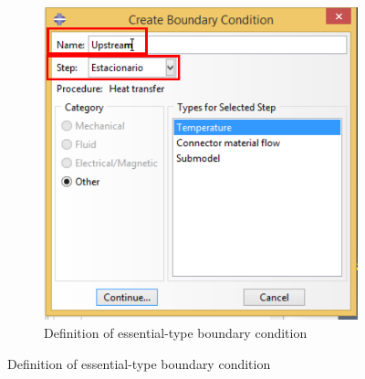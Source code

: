 \begin{figure}[!h]
\begin{subfigure}[!h]{0.45\textwidth}
      \includegraphics[width=\textwidth]{./body/images/load03.pdf}
      \caption{Definition of essential-type boundary condition}
      \label{load03}
    \end{subfigure}%


\end{figure}
